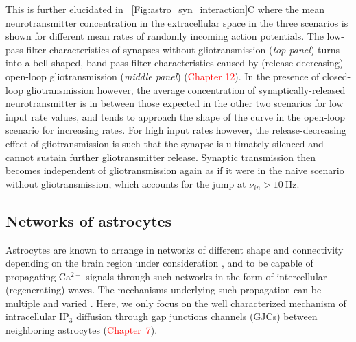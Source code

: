 \documentclass[a4paper, 11pt]{article}
\newcommand*{\figref}[1]{\figurename~\ref{#1}}
\begin{document}
This is further elucidated in \figref{Fig:astro_syn_interaction}C where the mean neurotransmitter concentration in the extracellular space in the three scenarios is shown for different mean rates of randomly incoming action potentials.
The low-pass filter characteristics of synapses without gliotransmission (\textit{top panel}) turns into a bell-shaped, band-pass filter characteristics caused by (release-decreasing) open-loop gliotransmission (\textit{middle panel}) (\textcolor{red}{Chapter 12}).
In the presence of closed-loop gliotransmission however, the average concentration of synaptically-released neurotransmitter is in between those expected in the other two scenarios for low input rate values, and tends to approach the shape of the curve in the open-loop scenario for increasing rates.
For high input rates however, the release-decreasing effect of gliotransmission is such that the synapse is ultimately silenced and cannot sustain further gliotransmitter release.
Synaptic transmission then becomes independent of gliotransmission again as if it were in the naive scenario without gliotransmission, which accounts for the jump at $\nu_{in}> \SI{10}{\hertz}$.

\subsection{Networks of astrocytes}\label{sec:astro-network}
Astrocytes are known to arrange in networks of different shape and connectivity depending on the brain region under consideration \citep{Giaume_etal_NatureRevNeurosci2010}, and to be capable of propagating Ca$^{2+}$ signals through such networks in the form of intercellular (regenerating) waves.
The mechanisms underlying such propagation can be multiple and varied \citep{ScemesGiaume2006}.
Here, we only focus on the well characterized mechanism of intracellular IP$_3$ diffusion through gap junctions channels (GJCs) between neighboring astrocytes (\textcolor{red}{Chapter~7}).
\end{document}
